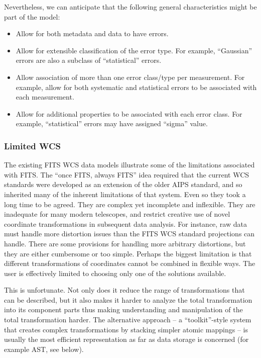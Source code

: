 \documentclass[final,authoryear,5p,times,twocolumn]{elsarticle}
\begin{document}
{{Nevertheless, we can anticipate that the following general
characteristics might be part of the model:

\begin{itemize}
\item Allow for both metadata and data to have errors.

\item Allow for extensible classification of the error type. For example,
``Gaussian'' errors are also a subclass of ``statistical'' errors.

\item Allow association of more than one error class/type per
measurement. For example, allow for both systematic and statistical
errors to be associated with each measurement.

\item Allow for additional properties to be associated with each error
class. For example, ``statistical'' errors may have assigned ``sigma''
value.
\end{itemize}

\subsubsection{Limited WCS\label{sec:wcs}}


The existing FITS WCS data models illustrate some of the limitations
associated with FITS. The ``once FITS, always FITS'' idea required that
the current WCS standards were developed as an extension of the older
AIPS standard, and so inherited many of the inherent limitations of
that system. Even so they took a long time to be agreed. They are
complex yet incomplete and inflexible. They are inadequate for many
modern telescopes, and restrict creative use of novel coordinate
transformations in subsequent data analysis. For instance, raw data
must handle more distortion issues than the FITS WCS standard
projections can handle. There are some provisions for handling more
arbitrary distortions, but they are either cumbersome or too
simple. Perhaps the biggest limitation is that different
transformations of coordinates cannot be combined in flexible
ways. The user is effectively limited to choosing only one of the solutions
available.


This is unfortunate. Not only does it reduce the range of
transformations that can be described, but it also makes it harder to
analyze the total transformation into its component parts thus making
understanding and manipulation of the total transformation harder. The
alternative approach -- a ``toolkit''-style system that creates complex
transformations by stacking simpler atomic mappings -- is usually the
most efficient representation as far as data storage is concerned
(for example AST, see below).


}}
\end{document}
